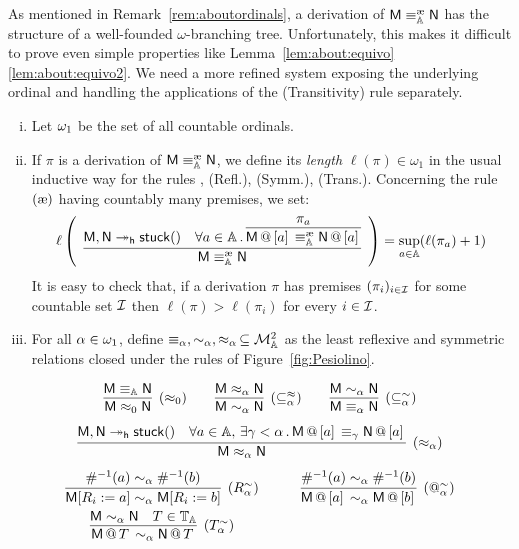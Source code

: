 As mentioned in Remark~\ref{rem:aboutordinals}, a derivation of $\mM\equivea\mN$ has the structure of a well-founded $\omega$-branching tree.
Unfortunately, this makes it difficult to prove even simple properties like Lemma~\ref{lem:about:equivo}\ref{lem:about:equivo2}.
We need a more refined system exposing the underlying ordinal and handling the applications of the (Transitivity) rule separately.

\begin{defi}
\begin{enumerate}[(i)]
\item Let $\omega_1$ be the set of all countable ordinals.
\item If $\pi$ is a derivation of $\mM\equivea\mN$, we define its \emph{length} $\ell(\pi)\in\omega_1$ in the usual inductive way for the rules \redwerule, (Refl.), (Symm.), (Trans.). Concerning the rule $\extrule$ having countably many premises, we set:
\[
	\ell\left(
	\begin{array}{c}
	\infer{\mM \equivea \mN}{
		\mach{M},\mach{N}\reddh\stuck{}&
		\forall a\in\Addrs\,.\, \infer{\append{\mM}{a} \equivea \append{\mN}{a}}{\pi_a}
	}
	\end{array}
	\right) = \sup_{a\in\Addrs}(\ell(\pi_a)+1)
\]
It is easy to check that, if a derivation $\pi$ has premises $(\pi_i)_{i\in \mathcal{I}}$ for some countable set $\mathcal{I}$ then $\ell(\pi) > \ell(\pi_i)$ for every $i\in\mathcal{I}$.
\item For all $\alpha\in\omega_1$, define $\equiv_{\alpha},\sim_{\alpha},\approx_{\alpha}\,\subseteq\mathcal{M}_{\mathbb{A}}^2$ as the least reflexive and symmetric relations closed under the rules of Figure~\ref{fig:Pesiolino}.
\end{enumerate}
\begin{figure}
\begin{gather*}
\infer[(\approx_0)]{\mM\pesc[0] \mN}{\mM\equiva \mN}
\qquad
\infer[(\subseteq^{\approx}_\alpha)]{\mM\svirg\mN}{\mM\pesc\mN}
\qquad
\infer[(\subseteq^{\sim}_\alpha)]{\mM\eq\mN}{\mM\svirg\mN}\\[3pt]
\infer[(\approx_\alpha)]{\mM\pesc\mN}{\mM,\mN\reddh\stuck{}&\forall a\in\Addrs,\,\exists\gamma < \alpha\,.\,\append{\mM}{a} \eq[\gamma] \append{\mN}{a}}\\[3pt]
\begin{array}{ccc}
	\infer[(R_\alpha^\sim)]{\mM\repl{R_i}{a}\svirg\mM\repl{R_i}{b}}{\Lookinv a\svirg \Lookinv b}
	&\quad&
	\infer[(@_\alpha^\sim)]{\append{\mM}{a}\svirg\append{\mM}{b}}{\Lookinv a\svirg \Lookinv b}\\[3pt]
	\infer[(T_\alpha^\sim)]{\appT{\mM}{T}\svirg\appT{\mN}{T}}{\mM\svirg \mN&T\in\Tapes}

\end{array}
\end{gather*}
\end{figure}
\end{defi}
